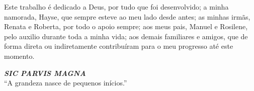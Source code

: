 \begin{dedicatoria}
   \vspace*{\fill}
    Este trabalho é dedicado a Deus, por tudo que foi desenvolvido; a minha namorada, Hayse, que sempre esteve ao meu lado desde antes; as minhas irmãs, Renata e Roberta, por todo o apoio sempre; aos meus pais, Manuel e Rosilene, pelo auxilio durante toda a minha vida; aos demais familiares e amigos, que de forma direta ou indiretamente contribuíram para o meu progresso at\'e este momento.

    \vspace{0.5cm}

    \noindent \textit{\textbf{SIC PARVIS MAGNA}}\\
    \small “A grandeza nasce de pequenos inícios.”
    
    
    
\end{dedicatoria}
